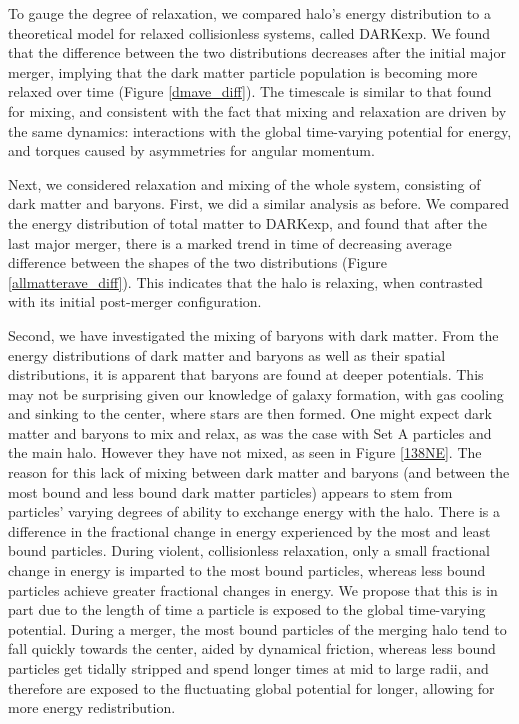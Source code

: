 \documentclass[a4paper,11pt]{article}
\begin{document}
To gauge the degree of relaxation, we compared halo's energy distribution to a theoretical model for relaxed collisionless systems, 
called DARKexp.  We found that the difference between the two distributions decreases after the initial major merger, implying that the dark matter particle 
population is becoming more relaxed over time (Figure \ref{dmave_diff}).  The timescale is similar to that found for mixing, and consistent with the fact that 
mixing and relaxation are driven by the same dynamics: interactions with the global time-varying potential for energy, and torques caused by asymmetries for 
angular momentum.

Next, we considered relaxation and mixing of the whole system, consisting of dark matter and baryons.
First, we did a similar analysis as before.  We compared the energy distribution of total matter to DARKexp, and found that after the last 
major merger, there is a marked trend in time of decreasing average difference between the shapes of the two distributions (Figure \ref{allmatterave_diff}).  
This indicates that the halo is relaxing, when contrasted with its initial post-merger configuration.   

Second, we have investigated the mixing of baryons with dark matter.  From the energy distributions of dark matter and baryons as well as their spatial 
distributions, it is apparent that baryons are found at deeper potentials.  This may not be surprising given our knowledge of galaxy formation, with gas 
cooling and sinking to the center, where stars are then formed.  One might expect dark matter and baryons to mix and relax, as was the case with Set A 
particles and the main halo.  However they have not mixed, as seen in Figure \ref{138NE}.  The reason for this lack of mixing between dark matter and baryons 
(and between the most bound and less bound dark matter particles) appears to stem from particles' varying degrees of ability to exchange energy with the halo.  
There is a difference in the fractional change in energy experienced by the most and least bound particles.  During violent, collisionless relaxation, only 
a small fractional change in energy is imparted to the most bound particles, whereas less bound particles achieve greater fractional changes in energy.  We 
propose that this is in part due to the length of time a particle is exposed to the global time-varying potential.  During a merger, the most bound particles 
of the merging halo tend to fall quickly towards the center, aided by dynamical friction, whereas less bound particles get tidally stripped and spend longer 
times at mid to large radii, and therefore are exposed to the fluctuating global potential for longer, allowing for more energy redistribution.  
\end{document}
